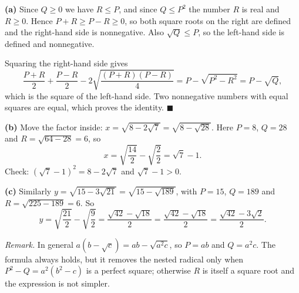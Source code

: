 \textbf{(a)} Since $Q\ge0$ we have $R\le P$, and since $Q\le P^2$ the number $R$ is real and $R\ge0$. Hence $P+R\ge P-R\ge0$, so both square roots on the right are defined and the right-hand side is nonnegative. Also $\sqrt Q\le P$, so the left-hand side is defined and nonnegative.

Squaring the right-hand side gives
\[\dfrac{P+R}{2}+\dfrac{P-R}{2}-2\sqrt{\dfrac{(P+R)(P-R)}{4}}=P-\sqrt{P^2-R^2}=P-\sqrt Q,\]
which is the square of the left-hand side. Two nonnegative numbers with equal squares are equal, which proves the identity. $\blacksquare$

\textbf{(b)} Move the factor inside: $x=\sqrt{8-2\sqrt7}=\sqrt{8-\sqrt{28}}$. Here $P=8$, $Q=28$ and $R=\sqrt{64-28}=6$, so
\[x=\sqrt{\dfrac{14}{2}}-\sqrt{\dfrac{2}{2}}=\boxed{\sqrt7-1}.\]
Check: $\left(\sqrt7-1\right)^2=8-2\sqrt7$ and $\sqrt7-1>0$.

\textbf{(c)} Similarly $y=\sqrt{15-3\sqrt{21}}=\sqrt{15-\sqrt{189}}$, with $P=15$, $Q=189$ and $R=\sqrt{225-189}=6$. So
\[y=\sqrt{\dfrac{21}{2}}-\sqrt{\dfrac{9}{2}}=\dfrac{\sqrt{42}-\sqrt{18}}{2}=\boxed{\dfrac{\sqrt{42}-\sqrt{18}}{2}}=\dfrac{\sqrt{42}-3\sqrt2}{2}.\]

\emph{Remark.} In general $a\left(b-\sqrt c\right)=ab-\sqrt{a^2c}$, so $P=ab$ and $Q=a^2c$. The formula always holds, but it removes the nested radical only when $P^2-Q=a^2\left(b^2-c\right)$ is a perfect square; otherwise $R$ is itself a square root and the expression is not simpler.

